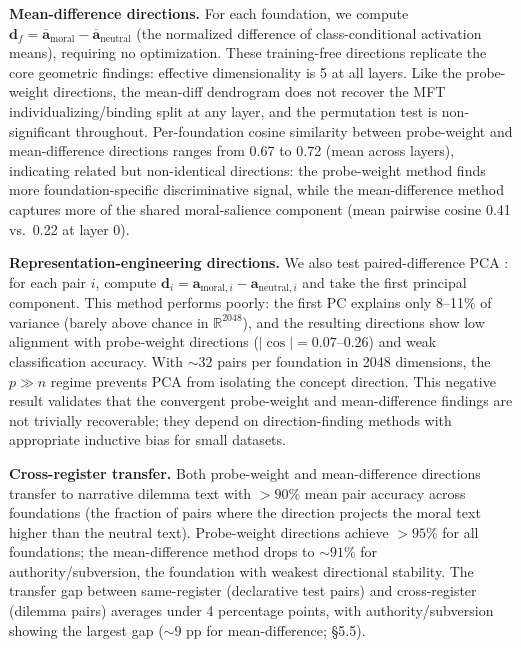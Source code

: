 \textbf{Mean-difference directions.} For each foundation, we compute
\(\mathbf{d}_f = \overline{\mathbf{a}}_{\text{moral}} -
\overline{\mathbf{a}}_{\text{neutral}}\) (the normalized difference
of class-conditional activation means), requiring no optimization.
These training-free directions replicate the core geometric
findings: effective dimensionality is 5 at all layers. Like the
probe-weight directions, the mean-diff dendrogram does not recover
the MFT individualizing/binding split at any layer, and the
permutation test is non-significant throughout. Per-foundation
cosine similarity between probe-weight and mean-difference
directions ranges from 0.67 to 0.72 (mean across layers),
indicating related but non-identical directions: the probe-weight
method finds more foundation-specific discriminative signal, while
the mean-difference method captures more of the shared
moral-salience component (mean pairwise cosine 0.41 vs.~0.22 at
layer 0).

\textbf{Representation-engineering directions.} We also test
paired-difference PCA \citep{zou2023representation}: for each
pair \(i\), compute \(\mathbf{d}_i = \mathbf{a}_{\text{moral},i} -
\mathbf{a}_{\text{neutral},i}\) and take the first principal
component. This method performs poorly: the first PC explains only
8--11\% of variance (barely above chance in \(\mathbb{R}^{2048}\)),
and the resulting directions show low alignment with probe-weight
directions (\(|\cos| = 0.07\)--\(0.26\)) and weak classification
accuracy. With \({\sim}32\) pairs per foundation in 2048 dimensions,
the \(p \gg n\) regime prevents PCA from isolating the concept
direction. This negative result validates that the convergent
probe-weight and mean-difference findings are not trivially
recoverable; they depend on direction-finding methods with
appropriate inductive bias for small datasets.

\textbf{Cross-register transfer.} Both probe-weight and mean-difference
directions transfer to narrative dilemma text with \(>90\)\% mean
pair accuracy across foundations (the fraction of pairs where the
direction projects the moral text higher than the neutral text).
Probe-weight directions achieve \(>95\)\% for all foundations; the
mean-difference method drops to \({\sim}91\)\% for authority/subversion,
the foundation with weakest directional stability. The transfer
gap between same-register (declarative test pairs) and cross-register
(dilemma pairs) averages under 4 percentage points, with
authority/subversion showing the largest gap (\({\sim}9\) pp for
mean-difference; \S5.5).

